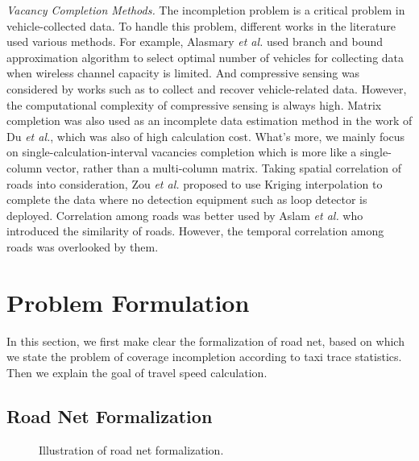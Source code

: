 \documentclass[twocolumn,10pt,final,conference]{IEEEtran}
\def\etal{\textit{et al.}\xspace}
\begin{document}
\emph{Vacancy Completion Methods.}
The incompletion problem is a critical problem in vehicle-collected data. To handle this problem, different works in the literature used various methods. For example, Alasmary \etal \cite{Ref41} used branch and bound approximation algorithm to select optimal number of vehicles for collecting data when wireless channel capacity is limited. And compressive sensing was considered by works such as \cite{Ref49} \cite{Ref50} \cite{Ref51} to collect and recover vehicle-related data. However, the computational complexity of compressive sensing is always high.
Matrix completion  was also used as an incomplete data estimation method in the work of Du \etal \cite{Ref16}, which was also of high calculation cost. What's more, we mainly focus on single-calculation-interval vacancies completion which is more like a single-column vector, rather than a multi-column matrix. Taking spatial correlation of roads into consideration, Zou \etal \cite{Ref82} proposed to use Kriging interpolation to complete the data where no detection equipment such as loop detector is deployed. Correlation among roads was better used by Aslam \etal \cite{Ref79} who introduced the similarity of roads. However, the temporal correlation among roads was overlooked by them.





\section{Problem Formulation}\label{section-Problem Formulation}
In this section, we first make clear the formalization of road net, based on which we state the problem of coverage incompletion according to taxi trace statistics. Then we explain the goal of travel speed calculation.

\subsection{Road Net Formalization}
\begin{figure}[h]
\centering
{}
\caption{Illustration of road net formalization.}
\label{fig-Illstration of road net}
\end{figure}
\end{document}

